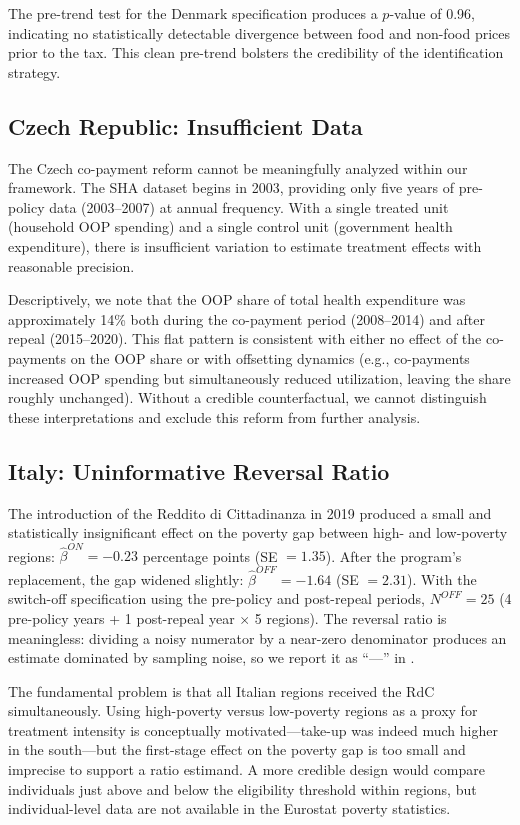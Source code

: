 \documentclass[12pt]{article}
\begin{document}
The pre-trend test for the Denmark specification produces a $p$-value of 0.96, indicating no statistically detectable divergence between food and non-food prices prior to the tax. This clean pre-trend bolsters the credibility of the identification strategy.

\subsection{Czech Republic: Insufficient Data}

The Czech co-payment reform cannot be meaningfully analyzed within our framework. The SHA dataset begins in 2003, providing only five years of pre-policy data (2003--2007) at annual frequency. With a single treated unit (household OOP spending) and a single control unit (government health expenditure), there is insufficient variation to estimate treatment effects with reasonable precision.

Descriptively, we note that the OOP share of total health expenditure was approximately 14\% both during the co-payment period (2008--2014) and after repeal (2015--2020). This flat pattern is consistent with either no effect of the co-payments on the OOP share or with offsetting dynamics (e.g., co-payments increased OOP spending but simultaneously reduced utilization, leaving the share roughly unchanged). Without a credible counterfactual, we cannot distinguish these interpretations and exclude this reform from further analysis.

\subsection{Italy: Uninformative Reversal Ratio}

The introduction of the Reddito di Cittadinanza in 2019 produced a small and statistically insignificant effect on the poverty gap between high- and low-poverty regions: $\hat{\beta}^{ON} = -0.23$ percentage points (SE $= 1.35$). After the program's replacement, the gap widened slightly: $\hat{\beta}^{OFF} = -1.64$ (SE $= 2.31$). With the switch-off specification using the pre-policy and post-repeal periods, $N^{OFF} = 25$ (4 pre-policy years + 1 post-repeal year $\times$ 5 regions). The reversal ratio is meaningless: dividing a noisy numerator by a near-zero denominator produces an estimate dominated by sampling noise, so we report it as ``---'' in .

The fundamental problem is that all Italian regions received the RdC simultaneously. Using high-poverty versus low-poverty regions as a proxy for treatment intensity is conceptually motivated---take-up was indeed much higher in the south---but the first-stage effect on the poverty gap is too small and imprecise to support a ratio estimand. A more credible design would compare individuals just above and below the eligibility threshold within regions, but individual-level data are not available in the Eurostat poverty statistics.
\end{document}
